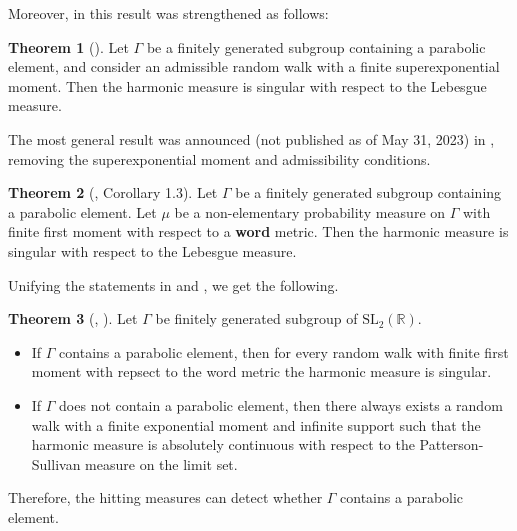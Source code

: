 \documentclass[11pt]{amsart}
\theoremstyle{definition}
\newtheorem{theorem}{Theorem}[section]
\begin{document}
	Moreover, in \cite{MR4069238} this result was strengthened as follows:
	
	\begin{theorem}[\cite{MR4069238}]
		Let $\Gamma$ be a finitely generated subgroup containing a parabolic element, and consider an admissible random walk with a finite superexponential moment. Then the harmonic measure is singular with respect to the Lebesgue measure.
	\end{theorem}
	
	The most general result was announced (not published as of May 31, 2023) in \cite{benard2023winding}, removing the superexponential moment and admissibility conditions. 
	
	\begin{theorem}[\cite{benard2023winding}, Corollary 1.3]
		Let $\Gamma$ be a finitely generated subgroup containing a parabolic element. Let $\mu$ be a non-elementary probability measure on $\Gamma$ with finite first moment with respect to a \textbf{word} metric. Then the harmonic measure is singular with respect to the Lebesgue measure.
	\end{theorem}
	
	Unifying the statements in \cite{benard2023winding} and \cite{linaudpan}, we get the following.
	
	\begin{theorem}[\cite{benard2023winding}, \cite{linaudpan}]
		Let $\Gamma$ be finitely generated subgroup of $\text{SL}_2(\mathbb{R})$.
		\begin{itemize}
			\item If $\Gamma$ contains a parabolic element, then for every random walk with finite first moment with repsect to the word metric the harmonic measure is singular.
			\item If $\Gamma$ does not contain a parabolic element, then there always exists a random walk with a finite exponential moment and infinite support such that the harmonic measure is absolutely continuous with respect to the Patterson-Sullivan measure on the limit set.
		\end{itemize}
	\end{theorem}
	
	Therefore, the hitting measures can detect whether $\Gamma$ contains a parabolic element.
	
\end{document}
